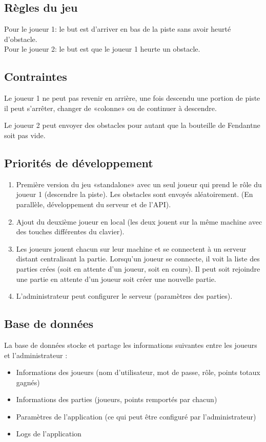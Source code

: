 \documentclass[a4paper,11pt]{article}
\begin{document}
	\subsection{Règles du jeu}
	Pour le joueur 1: le but est d'arriver en bas de la piste sans avoir heurté d'obstacle. \\
	Pour le joueur 2: le but est que le joueur 1 heurte un obstacle.

	\subsection{Contraintes}
	Le joueur 1 ne peut pas revenir en arrière, une fois descendu une portion de piste il peut s'arrêter, changer de «colonne» ou de continuer à descendre. \par

	Le joueur 2 peut envoyer des obstacles pour autant que la bouteille de Fendant\texttrademark ne soit pas vide.

	\subsection{Priorités de développement}

	\begin{enumerate}
		\item Première version du jeu «standalone» avec un seul joueur qui prend le rôle du joueur 1 (descendre la piste). Les obstacles sont envoyés aléatoirement. (En parallèle, développement du serveur et de l'API).
		\item Ajout du deuxième joueur en local (les deux jouent sur la même machine avec des touches différentes du clavier).
		\item Les joueurs jouent chacun sur leur machine et se connectent à un serveur distant centralisant la partie. Lorsqu'un joueur se connecte, il voit la liste des parties crées (soit en attente d'un joueur, soit en cours). Il peut soit rejoindre une partie en attente d'un joueur soit créer une nouvelle partie.
		\item L'administrateur peut configurer le serveur (paramètres des parties).
	\end{enumerate}

	\subsection{Base de données}
	La base de données stocke et partage les informations suivantes entre les joueurs et l'administrateur :
	\begin{itemize}
		\item Informations des joueurs (nom d'utilisateur, mot de passe, rôle, points totaux gagnés)
		\item Informations des parties (joueurs, points remportés par chacun)
		\item Paramètres de l'application (ce qui peut être configuré par l'administrateur)
		\item Logs de l'application
	\end{itemize}
\end{document}
